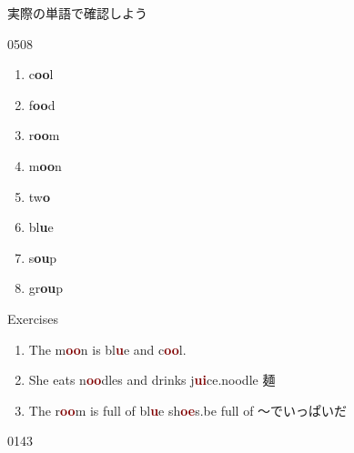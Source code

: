 \documentclass[aspectratio=169,xcolor={dvipsnames,table}]{beamer}
\begin{document}
\begin{frame}[plain]{実際の単語で確認しよう}

\LARGE
\hfill{\tiny 0508}\,{\scriptsize {}}

\vspace{-15pt}

\begin{enumerate}
 \item c\textcolor{NavyBlue}{\bfseries oo}l%
\hfill{}\hspace{150pt}\mbox{}
 \item f\textcolor{NavyBlue}{\bfseries oo}d%
\hfill{}\hspace{150pt}\mbox{}
\item r\textcolor{NavyBlue}{\bfseries oo}m%
\hfill{}\hspace{150pt}\mbox{}
 \item m\textcolor{NavyBlue}{\bfseries oo}n%
\hfill{}\hspace{150pt}\mbox{}
 \item tw\textcolor{NavyBlue}{\bfseries o}%
\hfill{}\hspace{150pt}\mbox{}
 \item bl\textcolor{NavyBlue}{\bfseries u}e%
\hfill{}\hspace{150pt}\mbox{} 
 \item s\textcolor{NavyBlue}{\bfseries ou}p%
\hfill{}\hspace{150pt}\mbox{}
 \item gr\textcolor{NavyBlue}{\bfseries ou}p%
\hfill{}\hspace{150pt}\mbox{}
\end{enumerate}
\end{frame}
\begin{frame}[plain]{Exercises }
\LARGE
\begin{enumerate}
 \item The m\textcolor{Maroon}{\bfseries oo}n is bl\textcolor{Maroon}{\bfseries u}e and c\textcolor{Maroon}{\bfseries oo}l.
 \item She eats n\textcolor{Maroon}{\bfseries oo}dles and drinks j\textcolor{Maroon}{\bfseries ui}ce.\hfill{\scriptsize noodle  麺}
 \item The r\textcolor{Maroon}{\bfseries oo}m is full of bl\textcolor{Maroon}{\bfseries u}e sh\textcolor{Maroon}{\bfseries oe}s.\hfill{\scriptsize be full of ～でいっぱいだ}

\end{enumerate}
\hfill{\tiny 0143}\,{\scriptsize {}}

\end{frame}
\end{document}
